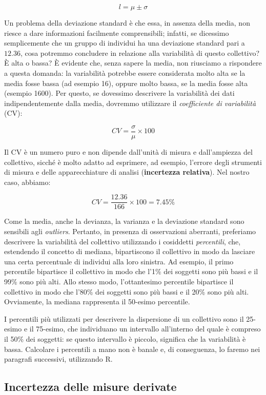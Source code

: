 \documentclass[a4paper,12pt,oneside]{book}
\begin{document}
\[l = \mu \pm \sigma\]

Un problema della deviazione standard è che essa, in assenza della media, non riesce a dare informazioni facilmente comprensibili; infatti, se dicessimo semplicemente che un gruppo di individui ha una deviazione standard pari a \(12.36\), cosa potremmo concludere in relazione alla variabilità di questo collettivo? È alta o bassa? È evidente che, senza sapere la media, non riusciamo a rispondere a questa domanda: la variabilità potrebbe essere considerata molto alta se la media fosse bassa (ad esempio 16), oppure molto bassa, se la media fosse alta (esempio 1600). Per questo, se dovessimo descrivere la variabilità dei dati indipendentemente dalla media, dovremmo utilizzare il \emph{coefficiente di variabilità} (CV):

\[CV = \frac{\sigma }{\mu } \times 100\]

Il CV è un numero puro e non dipende dall'unità di misura e dall'ampiezza del collettivo, sicché è molto adatto ad esprimere, ad esempio, l'errore degli strumenti di misura e delle apparecchiature di analisi (\textbf{incertezza relativa}). Nel nostro caso, abbiamo:

\[CV = \frac{12.36}{166} \times 100 = 7.45 \%\]

Come la media, anche la devianza, la varianza e la deviazione standard sono sensibili agli \emph{outliers}. Pertanto, in presenza di osservazioni aberranti, preferiamo descrivere la variabilità del collettivo utilizzando i cosiddetti \emph{percentili}, che, estendendo il concetto di mediana, bipartiscono il collettivo in modo da lasciare una certa percentuale di individui alla loro sinistra. Ad esempio, il primo percentile bipartisce il collettivo in modo che l'1\% dei soggetti sono più bassi e il 99\% sono più alti. Allo stesso modo, l'ottantesimo percentile bipartisce il collettivo in modo che l'80\% dei soggetti sono più bassi e il 20\% sono più alti. Ovviamente, la mediana rappresenta il 50-esimo percentile.

I percentili più utilizzati per descrivere la dispersione di un collettivo sono il 25-esimo e il 75-esimo, che individuano un intervallo all'interno del quale è compreso il 50\% dei soggetti: se questo intervallo è piccolo, significa che la variabilità è bassa. Calcolare i percentili a mano non è banale e, di conseguenza, lo faremo nei paragrafi successivi, utilizzando R.

\hypertarget{incertezza-delle-misure-derivate}{%
\subsection{Incertezza delle misure derivate}\label{incertezza-delle-misure-derivate}}
\end{document}
